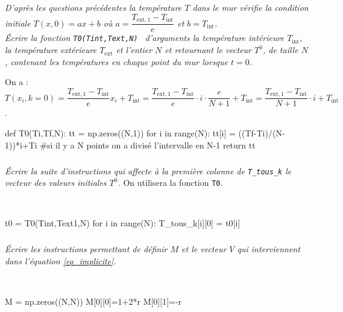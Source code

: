 \documentclass[10pt,fleqn]{article} %
\begin{document}
\begin{multicols}{2}
\begin{multicols}{2}
\subparagraph{}
\textit{D'après les questions précédentes la température $T$ dans le mur vérifie la condition
 initiale  $T(x,0)=ax+b$ où 
 $a=\dfrac{T_{\text{ext},1}-T_{\text{int}}}{e}$  et  $b=T_{\text{int}}$.\\
Écrire la fonction \texttt{T0(Tint,Text,N) } d'arguments la température intérieure $T_{\text{int}}$, 
la température extérieure $T_{\text{ext}}$ et l'entier $N$ et retournant le vecteur $T^0$, de taille $N$,
contenant les températures en chaque point du mur lorsque $t=0$. }
\ifprof
\begin{corrige} 
On a : $T(x_i,k=0)=\dfrac{T_{\text{ext},1}-T_{\text{int}}}{e}x_i + T_{\text{int}} = \dfrac{T_{\text{ext},1}-T_{\text{int}}}{e}\cdot i \cdot \dfrac{e}{N+1} + T_{\text{int}} =  \dfrac{T_{\text{ext},1}-T_{\text{int}}}{N+1}\cdot i  + T_{\text{int}}$.
~\\
\begin{python}
def T0(Ti,Tf,N):
    tt =  np.zeros((N,1))
    for i in range(N):
        tt[i] = ((Tf-Ti)/(N-1))*i+Ti #si il y a N points on a divisé l'intervalle en N-1
    return tt
\end{python}
\end{corrige}
\else
\fi



\subparagraph{}
\textit{Écrire la suite d'instructions qui affecte à la première colonne de \texttt{T\_tous\_k} 
 le vecteur des valeurs initiales $T^0$. }
 On utilisera la fonction \texttt{T0}. 
\ifprof
\begin{corrige}~\\

\begin{python}
t0 = T0(Tint,Text1,N)
for i in range(N):
    T_tous_k[i][0] = t0[i]
\end{python}
\end{corrige}
\else
\fi



\subparagraph{}
\textit{Écrire les instructions permettant de définir $M$ et le vecteur $V$ qui interviennent dans l'équation \ref{eq_implicite}. }
\ifprof
\begin{corrige} ~\\
\begin{python}
M = np.zeros((N,N))
M[0][0]=1+2*r
M[0][1]=-r


\end{python}
\end{corrige}
\end{multicols}
\end{multicols}
\end{document}
